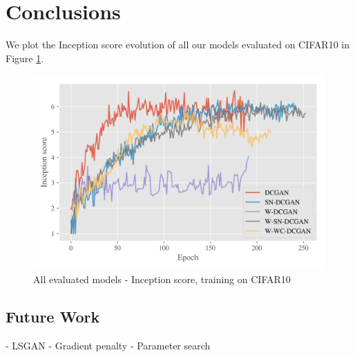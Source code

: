 
\section{Conclusions}

We plot the Inception score evolution of all our models evaluated on CIFAR10 in Figure \ref{fig:exp-all-is}.
\begin{figure}[h]
\centering
\includegraphics[width=\textwidth]{../code/results/figures/all_cifar10_is.png}
\caption{All evaluated models - Inception score, training on CIFAR10}
\label{fig:exp-all-is}
\end{figure}




\subsection{Future Work}


- LSGAN
- Gradient penalty
- Parameter search